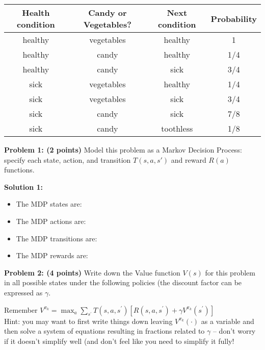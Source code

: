 \documentclass[]{article}
\begin{document}
\begin{table}[htb]
\centering
    \begin{tabular}{|c|c|c|c|}
      \hline
        Health condition &  Candy or Vegetables? &  Next condition & Probability \\\hline
        healthy &   vegetables &    healthy &   1 \\\hline
        healthy &   candy & healthy &   1/4 \\\hline
        healthy &   candy & sick &  3/4 \\\hline
        sick &  vegetables &    healthy &   1/4 \\\hline
        sick &  vegetables &    sick &  3/4 \\\hline
        sick &  candy & sick &  7/8 \\\hline
        sick &  candy & toothless &     1/8 \\\hline
    \end{tabular}
\end{table}

\textbf{Problem 1: (2 points)}
Model this problem as a Markov Decision Process: specify each state, action, and transition $T(s,a,s')$ and reward $R(a)$ functions.

\bigskip

\textbf{Solution 1:}
\begin{itemize}
    \item The MDP states are:
    \item The MDP actions are:
    \item The MDP transitions are:
    \item The MDP rewards are:
\end{itemize}

\clearpage
\textbf{Problem 2: (4 points)}
Write down the Value function $V(s)$ for this problem in all possible states under the following policies (the discount factor can be expressed as $\gamma$.

Remember $V^{\pi_k} = \max_a \sum_{s^\prime} T(s,a,s^{\prime})\left[R(s,a,s^\prime) + \gamma V^{\pi_k}(s^\prime)\right]$\\

Hint: you may want to first write things down leaving $V^{\pi_k}(\cdot)$ as a variable and then solve a system of equations resulting in fractions related to $\gamma$ -- don't worry if it doesn't simplify well (and don't feel like you need to simplify it fully!
\end{document}

